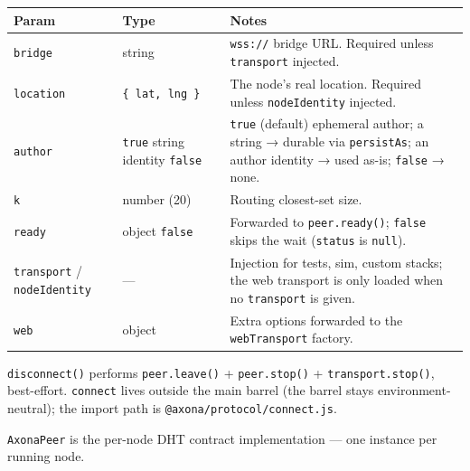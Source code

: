 \documentclass[
  nobib]{tufte-handout}
\newcounter{none} %
\begin{document}
{\def\LTcaptype{none} %
\begin{longtable}[]{@{}
  >{\raggedright\arraybackslash}p{}
  >{\raggedright\arraybackslash}p{}
  >{\raggedright\arraybackslash}p{}@{}}
\toprule\noalign{}
\begin{minipage}[b]{\linewidth}\raggedright
Param
\end{minipage} & \begin{minipage}[b]{\linewidth}\raggedright
Type
\end{minipage} & \begin{minipage}[b]{\linewidth}\raggedright
Notes
\end{minipage} \\
\midrule\noalign{}
\endhead
\bottomrule\noalign{}
\endlastfoot
\texttt{bridge} & string & \texttt{wss://} bridge URL. Required unless
\texttt{transport} injected. \\
\texttt{location} & \texttt{\{\ lat,\ lng\ \}} & The node's real
location. Required unless \texttt{nodeIdentity} injected. \\
\texttt{author} & \texttt{true} \textbar{} string \textbar{} identity
\textbar{} \texttt{false} & \texttt{true} (default) ephemeral author; a
string → durable via \texttt{persistAs}; an author identity → used
as-is; \texttt{false} → none. \\
\texttt{k} & number (20) & Routing closest-set size. \\
\texttt{ready} & object \textbar{} \texttt{false} & Forwarded to
\texttt{peer.ready()}; \texttt{false} skips the wait (\texttt{status} is
\texttt{null}). \\
\texttt{transport} / \texttt{nodeIdentity} & --- & Injection for tests,
sim, custom stacks; the web transport is only loaded when no
\texttt{transport} is given. \\
\texttt{web} & object & Extra options forwarded to the
\texttt{webTransport} factory. \\
\end{longtable}
}

\texttt{disconnect()} performs \texttt{peer.leave()} +
\texttt{peer.stop()} + \texttt{transport.stop()}, best-effort.
\texttt{connect} lives outside the main barrel (the barrel stays
environment-neutral); the import path is
\texttt{@axona/protocol/connect.js}.

\texttt{AxonaPeer} is the per-node DHT contract implementation --- one
instance per running node.
\end{document}
